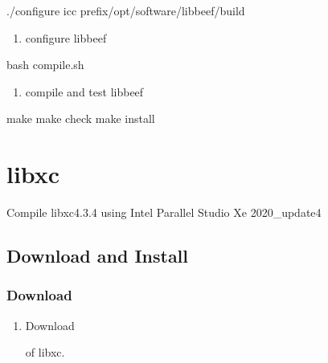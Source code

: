 \documentclass[a4paper,12pt,english]{sphinxmanual}
\begin{document}
\begin{sphinxVerbatim}[commandchars=\\\{\}]
./configure icc 
    \PYGZhy{}\PYGZhy{}prefix/opt/software/libbeef/build
\end{sphinxVerbatim}
\begin{enumerate}
%
\setcounter{enumi}{1}
\item {} 
\sphinxAtStartPar
configure libbeef

\end{enumerate}

\begin{sphinxVerbatim}[commandchars=\\\{\}]
bash compile.sh
\end{sphinxVerbatim}
\begin{enumerate}
%
\setcounter{enumi}{2}
\item {} 
\sphinxAtStartPar
compile and test libbeef

\end{enumerate}

\begin{sphinxVerbatim}[commandchars=\\\{\}]
make  make check  make install
\end{sphinxVerbatim}


\section{libxc}
\label{\detokenize{compile:libxc}}
\sphinxAtStartPar
Compile libxc\sphinxhyphen{}4.3.4 using Intel Parallel Studio Xe 2020\_update4


\subsection{Download and Install}
\label{\detokenize{compile/libxc_4.3.4:download-and-install}}\label{\detokenize{compile/libxc_4.3.4::doc}}

\subsubsection{Download}
\label{\detokenize{compile/libxc_4.3.4:download}}\begin{enumerate}
%
\item {} 
\sphinxAtStartPar
Download %
\begin{footnote}[14]\sphinxAtStartFootnote
{}
%
\end{footnote} of libxc.

\end{enumerate}
\end{document}
